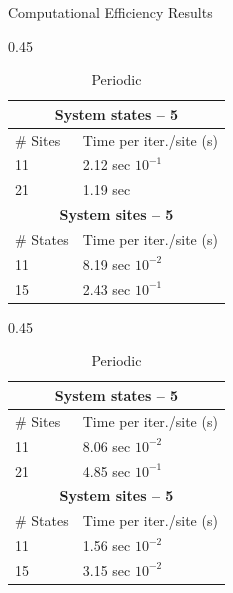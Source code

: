 \documentclass[final]{beamer}
\newlength{\onecolwid}
\newlength{\twocolwid}
\begin{document}
\begin{frame}[t]
\begin{columns}[t]
\begin{column}{\twocolwid}
\begin{columns}[t,totalwidth=\twocolwid]
\begin{column}{\onecolwid}
\begin{block}{Computational Efficiency Results}
\begin{table}[h!]
    \begin{subtable}[t]{0.45\textwidth}
    \centering
    \caption{Non-Periodic}
        \begin{tabular}{@{}ll@{}}
        \toprule
        \multicolumn{2}{c}{\textbf{System states – 5 }} \\
        \midrule
        \# Sites & Time per iter./site (s) \\
        \midrule
        11  & 2.12 sec $10^{-1}$ \\
        21 & 1.19 sec \\
        \midrule
        \multicolumn{2}{c}{\textbf{System sites – 5 }} \\
        \midrule
        \# States & Time per iter./site (s) \\
        \midrule
        11 & 8.19 sec $10^{-2}$ \\
        15 & 2.43 sec $10^{-1}$ \\
        \bottomrule
        \end{tabular}
    \end{subtable}
\hfill
    \begin{subtable}[t]{0.45\textwidth}
    \centering
    \caption{Periodic}
        \begin{tabular}{@{}ll@{}}
        \toprule
        \multicolumn{2}{c}{\textbf{System states – 5 }} \\
        \midrule
        \# Sites & Time per iter./site (s) \\
        \midrule
        11  & 8.06 sec $10^{-2}$ \\
        21 & 4.85 sec $10^{-1}$ \\
        \midrule
        \multicolumn{2}{c}{\textbf{System sites – 5 }} \\
        \midrule
        \# States & Time per iter./site (s) \\
        \midrule
        11 & 1.56 sec $10^{-2}$ \\
        15 & 3.15 sec $10^{-2}$ \\
        \bottomrule
        \end{tabular}
    \end{subtable}
\end{table}

\end{block}




\end{column} %


\end{columns}
\end{column}
\end{columns}
\end{frame}
\end{document}
